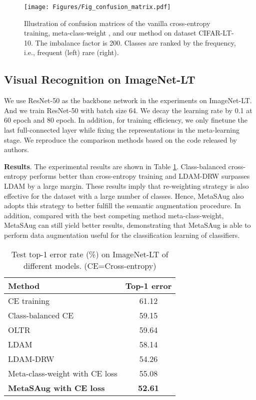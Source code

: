 \begin{figure*}[htbp]\centering
	\setlength{\abovecaptionskip}{0.cm}
	\setlength{\belowcaptionskip}{0.cm}
	\centering
	\texttt{[image: Figures/Fig\_confusion\_matrix.pdf]}
	\caption{Illustration of confusion matrices of the vanilla cross-entropy training, meta-class-weight \cite{jamal2020rethinking}, and our method on dataset CIFAR-LT-10. The imbalance factor is 200. Classes are ranked by the frequency, i.e., frequent (left)  rare (right).}
	\label{Fig_confusion_matrix}
\end{figure*}



\subsection{Visual Recognition on ImageNet-LT} \vspace{-1mm}
We use ResNet-50 \cite{resnet} as the backbone network in the experiments on ImageNet-LT. And we train ResNet-50 with batch size 64. We decay the learning rate by 0.1 at 60 epoch and 80 epoch. In addition, for training efficiency, we only finetune the last full-connected layer while fixing the representations in the meta-learning stage. We reproduce the comparison methods based on the code released by authors.

\textbf{Results}. The experimental results are shown in Table \ref{tab:ImageNet-LT}. Class-balanced cross-entropy performs better than cross-entropy training and LDAM-DRW surpasses LDAM by a large margin. These results imply that re-weighting strategy is also effective for the dataset with a large number of classes. Hence, MetaSAug also adopts this strategy to better fulfill the semantic augmentation procedure. In addition, compared with the best competing method meta-class-weight, MetaSAug can still yield better results, demonstrating that MetaSAug is able to perform data augmentation useful for the classification learning of classifiers.


\begin{table}
	\centering
	\caption {Test top-1 error rate (\%) on ImageNet-LT of different models. (CE=Cross-entropy)}
	{\begin{tabular}{l|c}
			\hline
			Method & Top-1 error \\ \hline
			CE training & 61.12 \\ \hline
			Class-balanced CE \cite{cui2019class}  & 59.15 \\ \hline
			OLTR \cite{liu2019large} & 59.64 \\ \hline
			LDAM \cite{cao2019learning} & 58.14 \\ \hline
			LDAM-DRW \cite{cao2019learning} & 54.26 \\ \hline
			Meta-class-weight with CE loss \cite{jamal2020rethinking} & 55.08 \\ \hline
			\textbf{MetaSAug with CE loss} & \textbf{52.61} \\ \hline
		\end{tabular}
	}\label{tab:ImageNet-LT}
	
\end{table}


